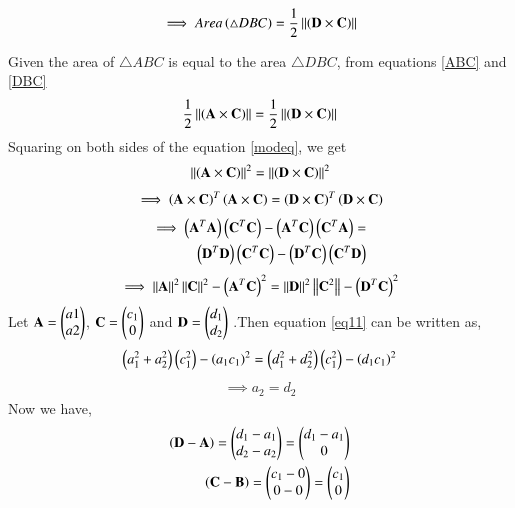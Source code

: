 \documentclass[journal,12pt,twocolumn]{IEEEtran}
\begin{document}
\begin{align}
    \label{DBC}
    \implies Area\left(\triangle DBC\right) = \frac{1}{2}\left\lVert\left(\mathbf{D} \times \mathbf{C}\right)\right\rVert
\end{align}
\item Given the area of $\triangle ABC$ is equal to the area $\triangle DBC$, from equations \eqref{ABC} and \eqref{DBC}
\begin{align}
    \label{modeq}
    \frac{1}{2}\left\lVert\left(\mathbf{A} \times \mathbf{C}\right)\right\rVert = \frac{1}{2}\left\lVert\left(\mathbf{D} \times \mathbf{C}\right)\right\rVert
\end{align}
Squaring on both sides of the equation \eqref{modeq}, we get
\begin{align}
    \left\lVert\left(\mathbf{A} \times \mathbf{C}\right)\right\rVert^2 = \left\lVert\left(\mathbf{D} \times \mathbf{C}\right)\right\rVert^2
\end{align}
\begin{align}
    \implies\left(\mathbf{A}\times\mathbf{C}\right)^T \left(\mathbf{A}\times\mathbf{C}\right) = \left(\mathbf{D}\times\mathbf{C}\right)^T \left(\mathbf{D}\times\mathbf{C}\right)
\end{align}
\begin{equation}
\begin{align}
    \implies \left(\mathbf{A}^T\mathbf{A}\right)\left(\mathbf{C}^T\mathbf{C}\right) - \left(\mathbf{A}^T\mathbf{C}\right)\left(\mathbf{C}^T\mathbf{A}\right) =\\ \left(\mathbf{D}^T\mathbf{D}\right)\left(\mathbf{C}^T\mathbf{C}\right) - \left(\mathbf{D}^T\mathbf{C}\right)\left(\mathbf{C}^T\mathbf{D}\right)
\end{align}
\end{equation}
\begin{align}
    \label{eq11}
    \implies\left\lVert\mathbf{A}\right\rVert^2\left\lVert\mathbf{C}\right\rVert^2 - \left(\mathbf{A}^T\mathbf{C}\right)^2 = \left\lVert\mathbf{D}\right\rVert^2\left\lVert\mathbf{C}^2\right\rVert - \left(\mathbf{D}^T\mathbf{C}\right)^2 
\end{align}
Let $\mathbf{A}=\begin{pmatrix}a1\\a2\end{pmatrix}$, $\mathbf{C}=\begin{pmatrix}c_1\\0\end{pmatrix}$ and $\mathbf{D}=\begin{pmatrix}d_1\\d_2\end{pmatrix}$ .Then equation \eqref{eq11} can be written as,
\begin{align}
    \label{lbo}
    \left(a_1^2+a_2^2\right)\left(c_1^2\right)-\left(a_1c_1\right)^2 = \left(d_1^2+d_2^2\right)\left(c_1^2\right) - \left(d_1c_1\right)^2
\end{align}
\begin{align}
    \implies a_2 = d_2
\end{align}
Now we have,
\begin{align}
    \label{eq14}
    \left(\mathbf{D}-\mathbf{A}\right)=\begin{pmatrix}d_1-a_1\\d_2-a_2\end{pmatrix} = \begin{pmatrix}d_1-a_1\\0\end{pmatrix}\\ 
    \label{eq15}
    \left(\mathbf{C}-\mathbf{B}\right) = \begin{pmatrix}c_1-0 \\ 0-0\end{pmatrix} = \begin{pmatrix}c_1 \\ 0\end{pmatrix}
\end{align}
\end{document}
